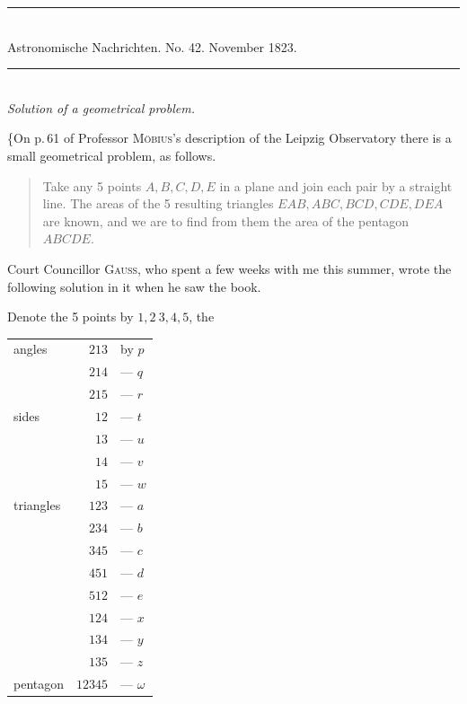 \clearpage
{}%
\begin{center}
\rule{.8\textwidth}{.4pt}\\[4pt]
Astronomische Nachrichten. No. 42. November 1823.\\[4pt]
\rule{.8\textwidth}{.4pt}\\[12pt]
\textit{Solution of a geometrical problem.}
\end{center}
\hspace*{\parindent}\{On p.\,61 of Professor \textsc{Möbius}'s description of the Leipzig Observatory there is a small geometrical problem, as follows.
\begin{quote}
Take any 5 points \(A,B,C,D,E\) in a plane and join each pair by a straight line. The areas of the 5 resulting triangles \(EAB,ABC,BCD,CDE,DEA\) are known, and we are to find from them the area of the pentagon \(ABCDE\).
\end{quote}
Court Councillor \textsc{Gauss}, who spent a few weeks with me this summer, wrote the following solution in it when he saw the book.

Denote the 5 points by \(1,2\ 3,4,5\), the
\begin{center}
\begin{tabular}{lrl}
angles&\(213\)&by \(p\)\\
&\(214\)&— \(q\)\\
&\(215\)&— \(r\)\\\hline
sides&\(12\)&— \(t\)\\
&\(13\)&— \(u\)\\
&\(14\)&— \(v\)\\
&\(15\)&— \(w\)\\\hline
triangles&\(123\)&— \(a\)\\
&\(234\)&— \(b\)\\
&\(345\)&— \(c\)\\
&\(451\)&— \(d\)\\
&\(512\)&— \(e\)\\
&\(124\)&— \(x\)\\
&\(134\)&— \(y\)\\
&\(135\)&— \(z\)\\\hline
pentagon&\(12345\)&— \(\omega\)
\end{tabular}
\end{center}
